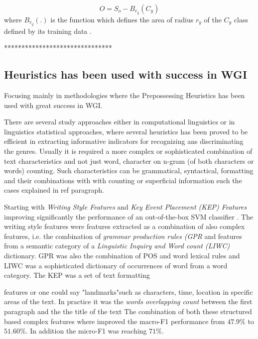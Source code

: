 \begin{equation}\label{eq:openspace_spherical_constrained}
	O = S_{o} - B_{r_{y}}(C_{y})
\end{equation}
where $B_{r_{y}}(.)$ is the function which defines the area of radius $r_{y}$ of the $C_{y}$ class defined by its training data \parencite{fei2016breaking}.

*******************************

\subsection{Heuristics has been used with success in WGI}\label{chap:relevant_work:sec:features:subsec:heuristics}
Focusing mainly in methodologies where the Prepossessing Heuristics has been used with great success in WGI.

There are several study approaches either in computational linguistics or in linguistics statistical approaches, where several heuristics has been proved to be efficient in extracting informative indicators for recognizing ans discriminating the genres. Usually it is required a more complex or sophisticated combination of text characteristics and not just word, character on n-gram (of both characters or words) counting. Such characteristics can be grammatical, syntactical, formatting and their combinations with  with counting or superficial information such the cases explained in ref{} paragraph.

Starting with \textit{Writing Style Features} and \textit{Key Event Placement (KEP) Features} improving significantly the performance of an out-of-the-box SVM classifier \parencite{dai2018fine}.  The writing style features were features extracted as a combination of also complex features, i.e. the combination of \textit{grammar production rules (GPR} and features from a semantic category of a \textit{Linguistic Inquiry and Word count (LIWC)} dictionary. GPR was also the combination of POS and word lexical rules and LIWC was a sophisticated dictionary of occurrences of word from a word category. The KEP was a set of text formatting

features or one could say "landmarks"such as characters, time, location in specific areas of the text. In practice it was the \textit{words overlapping count} between the first paragraph and the the title of the text The combination of both these structured based complex features where improved the macro-F1 performance from $47.9\%$ to $51.60\%$. In addition the micro-F1 was reaching $71\%$. 

